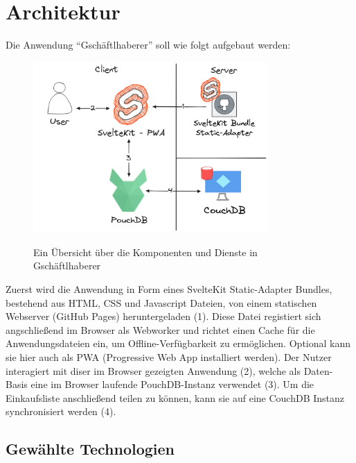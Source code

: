 \section{Architektur}

Die Anwendung ``Gschäftlhaberer'' soll wie folgt aufgebaut werden:

\vspace{1em}

\begin{figure}
    \centering
	\includegraphics[width=0.8\textwidth]{images/architecture.png}
    \caption{Ein Übersicht über die Komponenten und Dienste in Gschäftlhaberer}\cite{shopping-list:architecture}
\end{figure}

Zuerst wird die Anwendung in Form eines SvelteKit Static-Adapter Bundles, bestehend aus HTML, CSS und Javascript Dateien, von einem statischen Webserver (GitHub Pages) heruntergeladen (1). Diese Datei registiert sich angschlie{\ss}end im Browser als Webworker und richtet einen Cache für die Anwendungsdateien ein, um Offline-Verfügbarkeit zu ermöglichen. Optional kann sie hier auch als PWA (Progressive Web App installiert werden). Der Nutzer interagiert mit diser im Browser gezeigten Anwendung (2), welche als Daten-Basis eine im Browser laufende PouchDB-Instanz verwendet (3). Um die Einkaufsliste anschließend teilen zu können, kann sie auf eine CouchDB Instanz synchronisiert werden (4).

\subsection{Gewählte Technologien}

